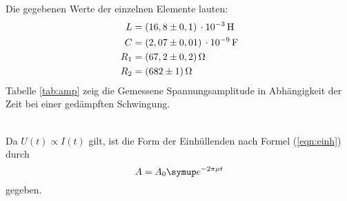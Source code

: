 Die gegebenen Werte der einzelnen Elemente lauten:
\begin{align*}
  L &= (16,8 \pm 0,1) \,\cdot 10^{-3}\Hen \\
  C &= (2,07 \pm 0,01) \,\cdot 10^{-9} \Far \\
  R_1 &= (67,2 \pm 0,2) \Ohm \\
  R_2 &= (682 \pm 1) \Ohm
\end{align*}
Tabelle \ref{tab:amp} zeig die Gemessene Spannungsamplitude in Abhängigkeit der Zeit bei
einer gedämpften Schwingung.

\\
Da $U(t)\propto I(t)$ gilt, ist die Form der Einhüllenden nach Formel
(\ref{eqn:einh}) durch
\begin{equation}
  A = A_0\su{e}^{-2\pi\mu t}
\end{equation}
gegeben.

